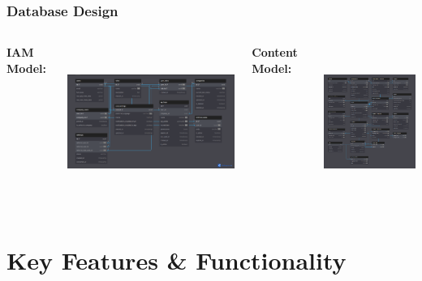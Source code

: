\documentclass{beamer}
\begin{document}
\begin{frame}
\frametitle{Database Design}
\begin{columns}
\textbf{IAM Model:}
\begin{center}
    \includegraphics[width=\textwidth,height=5cm,keepaspectratio]{week_1_img/services_db_screanshots/Screenshot 2025-06-06 at 15-08-36 IAM_Service.pdf.png}
\end{center}

\textbf{Content Model:}
\begin{center}
    \includegraphics[width=\textwidth,height=5cm,keepaspectratio]{week_1_img/services_db_screanshots/Screenshot 2025-06-06 at 15-07-51 Content_Service.pdf.png}
\end{center}
\end{columns}
\end{frame}

\section{Key Features \& Functionality}
\end{document}
